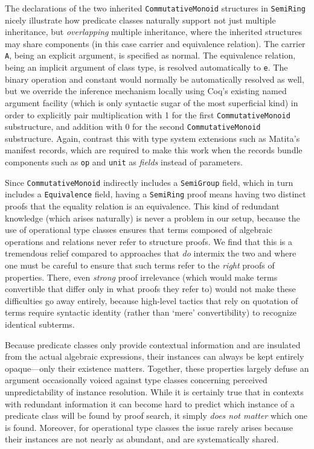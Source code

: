 \documentclass[a4paper,10pt,runningheads]{llncs}
\begin{document}
The declarations of the two inherited \lstinline|CommutativeMonoid| structures in \lstinline|SemiRing| nicely illustrate how predicate classes naturally support not just multiple inheritance, but \emph{overlapping} multiple inheritance, where the inherited structures may share components (in this case carrier and equivalence relation). The carrier \lstinline|A|, being an explicit argument, is specified as normal. The equivalence relation, being an implicit argument of class type, is resolved automatically to \lstinline|e|. The binary operation and constant would normally be automatically resolved as well, but we override the inference mechanism locally using Coq's existing named argument facility (which is only syntactic sugar of the most superficial kind) in order to explicitly pair multiplication with 1 for the first \lstinline|CommutativeMonoid| substructure, and addition with 0 for the second \lstinline|CommutativeMonoid| substructure. Again, contrast this with type system extensions such as Matita's manifest records, which are required to make this work when the records bundle components such as \lstinline|op| and \lstinline{unit} as \emph{fields} instead of parameters.

Since \lstinline|CommutativeMonoid| indirectly includes a \lstinline|SemiGroup| field, which in turn includes a \lstinline|Equivalence| field, having a \lstinline|SemiRing| proof means having two distinct proofs that the equality relation is an equivalence. This kind of redundant knowledge (which arises naturally) is never a problem in our setup, because the use of operational type classes ensures that terms composed of algebraic operations and relations never refer to structure proofs. We find that this is a tremendous relief compared to approaches that \emph{do} intermix the two and where one must be careful to ensure that such terms refer to the \emph{right} proofs of properties. There, even \emph{strong} proof irrelevance (which would make terms convertible that differ only in what proofs they refer to) would not make these difficulties go away entirely, because high-level tactics that rely on quotation of terms require syntactic identity (rather than `mere' convertibility) to recognize identical subterms.

Because predicate classes only provide contextual information and are insulated from the actual algebraic expressions, their instances can always be kept entirely opaque---only their existence matters. Together, these properties largely defuse an argument occasionally voiced against type classes concerning perceived unpredictability of instance resolution. While it is certainly true that in contexts with redundant information it can become hard to predict which instance of a predicate class will be found by proof search, it simply \emph{does not matter} which one is found. Moreover, for operational type classes the issue rarely arises because their instances are not nearly as abundant, and are systematically shared.
\end{document}
